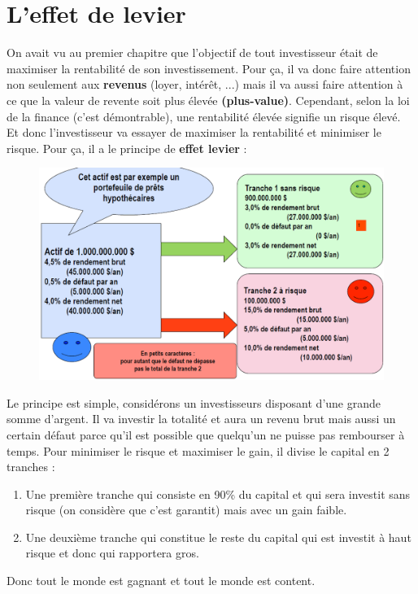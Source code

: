 \section{L'effet de levier}
On avait vu au premier chapitre que l'objectif de tout investisseur était de maximiser la rentabilité de son investissement. Pour ça, il va donc faire attention non seulement aux \textbf{revenus} (loyer, intérêt, ...) mais il va aussi faire attention à ce que la valeur de revente soit plus élevée \textbf{(plus-value)}. Cependant, selon la loi de la finance (c'est démontrable), une rentabilité élevée signifie un risque élevé. Et donc l'investisseur va essayer de maximiser la rentabilité et minimiser le risque. Pour ça, il a le principe de \textbf{effet levier} :

\begin{figure}
\includegraphics[scale=0.3]{4}
\end{figure}
Le principe est simple, considérons un investisseurs disposant d'une grande somme d'argent. Il va investir la totalité et aura un revenu brut mais aussi un certain défaut parce qu'il est possible que quelqu'un ne puisse pas rembourser à temps. Pour minimiser le risque et maximiser le gain, il divise le capital en 2 tranches :
\\
\begin{enumerate}
\item Une première tranche qui consiste en 90\% du capital et qui sera investit sans risque (on considère que c'est garantit) mais avec un gain faible.

\item Une deuxième tranche qui constitue le reste du capital qui est investit à haut risque et donc qui rapportera gros. 
\end{enumerate}
Donc tout le monde est gagnant et tout le monde est content. 

